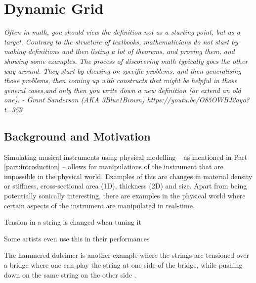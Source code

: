 \chapter{Dynamic Grid}\label{ch:dynamicGrid}

\textit{Often in math, you should view the definition not as a starting point, but as a target. Contrary to the structure of textbooks, mathematicians do not start by making definitions and then listing a lot of theorems, and proving them, and showing some examples. The process of discovering math typically goes the other way around. They start by chewing on specific problems, and then generalising those problems, then coming up with constructs that might be helpful in those general cases,and only then you write down a new definition (or extend an old one). - Grant Sanderson (AKA 3Blue1Brown) https://youtu.be/O85OWBJ2ayo?t=359}
\section{Background and Motivation}
Simulating musical instruments using physical modelling -- as mentioned in Part \ref{part:introduction} -- allows for manipulations of the instrument that are impossible in the physical world. Examples of this are changes in material density or stiffness, cross-sectional area (1D), thickness (2D) and size. Apart from being potentially sonically interesting, there are examples in the physical world where certain aspects of the instrument are manipulated in real-time.

Tension in a string is changed when tuning it

Some artists even use this in their performances \cite{Gomm2011, Mayer2008}

The hammered dulcimer is another example where the strings are tensioned over a bridge where one can play the string at one side of the bridge, while pushing down on the same string on the other side \cite{Glenn2014}.

